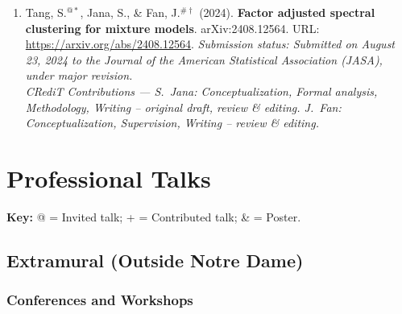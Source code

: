 \documentclass[letterpaper,oneside]{article}
\begin{document}
\begin{enumerate}[leftmargin=*,label=P\arabic*.]
  \item Tang, S.$^{@*}$, Jana, S., \& Fan, J.$^{\#\dagger}$ (2024). {\textbf{Factor adjusted spectral clustering for mixture models}}. arXiv:2408.12564. URL: \href{https://arxiv.org/abs/2408.12564}{https://arxiv.org/abs/2408.12564}. \textit{Submission status: Submitted on August 23, 2024 to the Journal of the American Statistical Association (JASA), under major revision.}\\
  \textit{CRediT Contributions --- S.~Jana: Conceptualization, Formal analysis, Methodology, Writing -- original draft, review \& editing. J.~Fan: Conceptualization, Supervision, Writing -- review \& editing.}

\end{enumerate}

\section*{Professional Talks}

\noindent\textbf{Key:} @ = Invited talk; + = Contributed talk;  \& = Poster.

\subsection*{Extramural (Outside Notre Dame)}

\subsubsection*{Conferences and Workshops}
\end{document}
